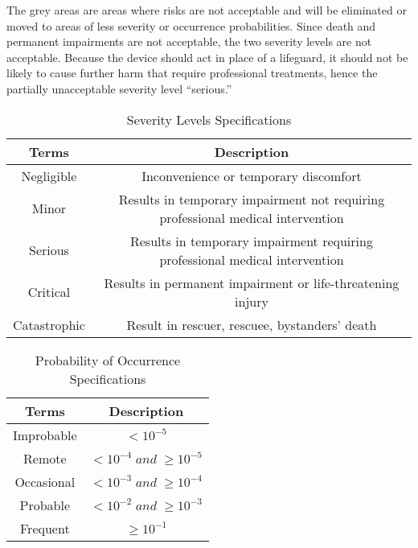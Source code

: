     The grey areas are areas where risks are not acceptable and will be eliminated or moved to 
    areas of less severity or occurrence probabilities. Since death and permanent impairments are not acceptable, 
    the two severity levels are not acceptable. Because the device should act in place of a lifeguard, it should not be 
    likely to cause further harm that require professional treatments, hence the partially unacceptable severity level “serious.” \\
    
\begin{table}[h!]
    \begin{center}
    \begin{tabular}{|c|c|}
        \hline
        Terms&Description\\
        \hline
        Negligible&Inconvenience or temporary discomfort\\
        \hline
        Minor  &Results in temporary impairment not requiring professional medical intervention\\
        \hline
        Serious&Results in temporary impairment requiring professional medical intervention\\
        \hline
        Critical&Results in permanent impairment or life-threatening injury\\
        \hline
        Catastrophic&Result in rescuer, rescuee, bystanders’ death\\
        \hline
    \end{tabular}
    \caption{Severity Levels Specifications}
    \label{tab:Figure}
\end{center}
\end{table}

\begin{table}[H]
    \begin{center}
    \begin{tabular}{|c|c|}
        \hline
        Terms&Description\\
        \hline
        Improbable&$<10^{-5}$\\
        \hline
        Remote&$<10^{-4}\; and \; \geq 10^{-5}$\\
        \hline
        Occasional&$<10^{-3} \;and \;\geq 10^{-4}$\\
        \hline
        Probable&$<10^{-2} \; and\; \geq 10^{-3}$\\
        \hline
        Frequent&$\geq 10^{-1}$\\
        \hline
    \end{tabular}
    \caption{Probability of Occurrence Specifications}
    \label{tab:Figure}
\end{center}
\end{table}    

% 